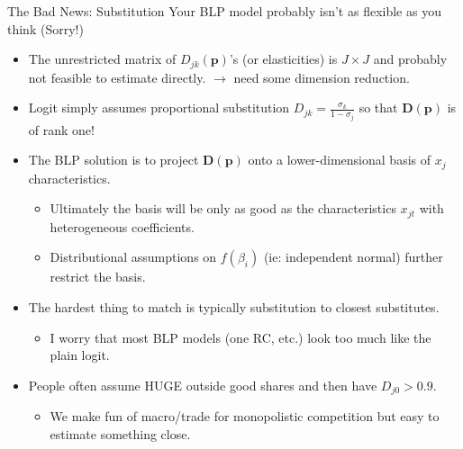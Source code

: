 \documentclass[aspectratio=169,10pt]{beamer}
\begin{document}
\begin{frame}{The Bad News: Substitution}
Your BLP model probably isn't as flexible as you think (Sorry!)
\begin{itemize}
\item The unrestricted matrix of $D_{jk}(\symbf{p})$'s (or elasticities) is $J \times J$ and probably not feasible to estimate directly. $\rightarrow$ need some \alert{dimension reduction}.
\item Logit simply assumes proportional substitution ${D}_{jk}=\frac{\sigma_k}{1-\sigma_{j}}$ so that $\symbf{D}(\symbf{p})$ is of rank one!
\item The BLP solution is to project $\symbf{D}(\symbf{p})$ onto a lower-dimensional basis of $x_{j}$ characteristics.
\begin{itemize}
\item Ultimately the basis will be only as good as the characteristics $x_{jt}$ with heterogeneous coefficients.
\item Distributional assumptions on $f(\beta_i)$ (ie: independent normal) further restrict the basis.
\end{itemize}
\item The hardest thing to match is typically \alert{substitution to closest substitutes}.
\begin{itemize}
\item I worry that most BLP models (one RC, etc.) look too much like the plain logit.
\end{itemize}
\item People often assume \alert{HUGE outside good shares} and then have $D_{j0}>0.9$.
\begin{itemize}
    \item We make fun of macro/trade for \alert{monopolistic competition} but easy to estimate something close.
\end{itemize}
\end{itemize}
\end{frame}
\end{document}
